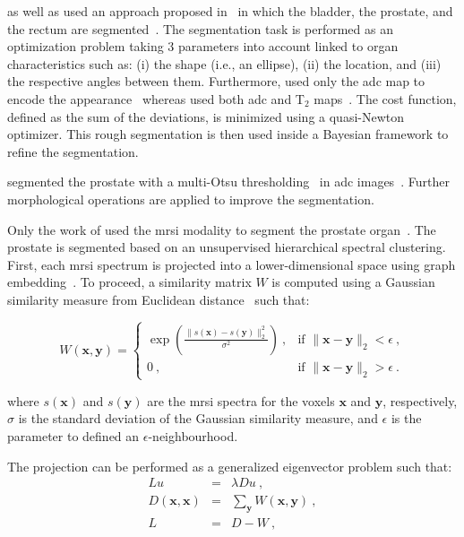 \begin{enumerate}[leftmargin=*]
\citeauthor{Litjens2011} as well as \citeauthor{Vos2012} used an approach
proposed in~\cite{Huisman2010} in which the bladder, the prostate, and the
rectum are segmented~\cite{Litjens2011,Vos2012}.
The segmentation task is performed as an optimization problem taking 3
parameters into account linked to organ characteristics such as: (i) the shape
(i.e., an ellipse), (ii) the location, and (iii) the respective angles between
them.
Furthermore, \citeauthor{Litjens2011} used only the \ac{adc} map to encode the
appearance~\cite{Litjens2011} whereas \citeauthor{Vos2012} used both \ac{adc}
and T$_2$ maps~\cite{Vos2012}.
The cost function, defined as the sum of the deviations, is minimized using a
quasi-Newton optimizer.
This rough segmentation is then used inside a Bayesian framework to refine the
segmentation.

\citeauthor{giannini2015fully} segmented the prostate with a multi-Otsu
thresholding~\cite{otsu1975threshold} in \ac{adc}
images~\cite{giannini2015fully}.
Further morphological operations are applied to improve the segmentation.

Only the work of \citeauthor{Tiwari2009} used the \ac{mrsi} modality to segment
the prostate organ~\cite{Tiwari2009}.
The prostate is segmented based on an unsupervised hierarchical spectral
clustering.
First, each \ac{mrsi} spectrum is projected into a lower-dimensional space
using graph embedding~\cite{Shi2000}.
To proceed, a similarity matrix $W$ is computed using a Gaussian similarity
measure from Euclidean distance~\cite{Belkin2001} such that:

\begin{equation}
  W(\mathbf{x},\mathbf{y}) =
  \begin{cases}
    \exp \left( \frac{\| s(\mathbf{x}) - s(\mathbf{y}) \|_2^2}{\sigma^2}
    \right) \ , & \text{if } \| \mathbf{x} - \mathbf{y} \|_2 < \epsilon \ , \\
    0 \ , & \text{if } \| \mathbf{x} - \mathbf{y} \|_2 > \epsilon \ .
  \end{cases}
  \label{eq:ge1}
\end{equation}

\noindent where $s(\mathbf{x})$ and $s(\mathbf{y})$ are the \ac{mrsi} spectra
for the voxels $\mathbf{x}$ and $\mathbf{y}$, respectively, $\sigma$ is the
standard deviation of the Gaussian similarity measure, and $\epsilon$ is the
parameter to defined an $\epsilon$-neighbourhood.

The projection can be performed as a generalized eigenvector problem such that:
\begin{eqnarray}
  Lu & = & \lambda D u \ , \nonumber \\
  D(\mathbf{x},\mathbf{x}) & = & \sum_{\mathbf{y}} W(\mathbf{x},\mathbf{y}) \
                                 , \label{eq:ge2} \\
  L & = & D-W \ , \nonumber
\end{eqnarray}


\end{enumerate}
